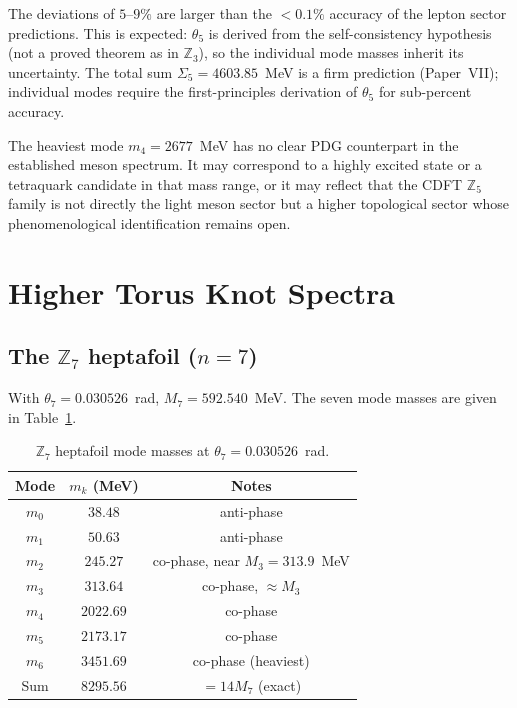 \documentclass[11pt]{article}
\begin{document}
The deviations of $5$--$9\%$ are larger than the $<0.1\%$ accuracy of the
lepton sector predictions.
This is expected: $\theta_5$ is derived from the self-consistency hypothesis
(not a proved theorem as in $\mathbb{Z}_3$), so the individual mode masses
inherit its uncertainty.
The total sum $\Sigma_5 = 4603.85$~MeV is a firm prediction (Paper~VII);
individual modes require the first-principles derivation of $\theta_5$ for
sub-percent accuracy.

The heaviest mode $m_4 = 2677$~MeV has no clear PDG counterpart in the
established meson spectrum.
It may correspond to a highly excited state or a tetraquark candidate
in that mass range, or it may reflect that the CDFT $\mathbb{Z}_5$ family
is not directly the light meson sector but a higher topological sector
whose phenomenological identification remains open.


\section{Higher Torus Knot Spectra}
\label{sec:higher_spectra}

\subsection{The $\mathbb{Z}_7$ heptafoil ($n = 7$)}

With $\theta_7 = 0.030526$~rad, $M_7 = 592.540$~MeV.
The seven mode masses are given in Table~\ref{tab:Z7_masses}.

\begin{table}[ht]
  \caption{$\mathbb{Z}_7$ heptafoil mode masses at $\theta_7 = 0.030526$~rad.}
  \label{tab:Z7_masses}
  \begin{tabular}{ccc}
    \toprule
    Mode & $m_k$ (MeV) & Notes \\
    \midrule
    $m_0$ & $38.48$  & anti-phase \\
    $m_1$ & $50.63$  & anti-phase \\
    $m_2$ & $245.27$ & co-phase, near $M_3 = 313.9$~MeV \\
    $m_3$ & $313.64$ & co-phase, $\approx M_3$ \\
    $m_4$ & $2022.69$ & co-phase \\
    $m_5$ & $2173.17$ & co-phase \\
    $m_6$ & $3451.69$ & co-phase (heaviest) \\
    \midrule
    Sum   & $8295.56$ & $= 14 M_7$ (exact) \\
    \bottomrule
  \end{tabular}
\end{table}
\end{document}
